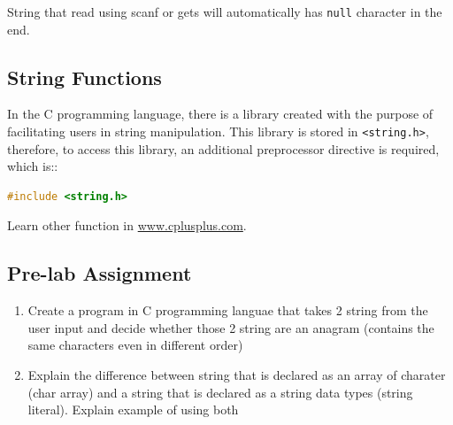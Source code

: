 String that read using scanf or gets will automatically has \verb|null| character in the end.
\subsection{String Functions}

In the C programming language, there is a library created with the purpose of facilitating users in string manipulation. This library is stored in \verb|<string.h>|,
therefore, to access this library, an additional preprocessor directive is required, which is::
\begin{lstlisting}[language=c]
	#include <string.h>
\end{lstlisting}

Learn other function in \href{http://www.cplusplus.com/}{www.cplusplus.com}.

\subsection{Pre-lab Assignment}
\begin{enumerate}
	\item Create a program in C programming languae that takes 2 string from the user input and decide whether those 2 string are an anagram (contains the same characters even in different order)
	\item Explain the difference between string that is declared as an array of charater (char array) and a string that is declared as a string data types (string literal). Explain example of using both
\end{enumerate}